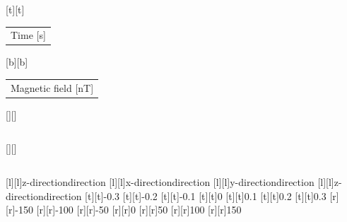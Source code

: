 %    
%
%
\begin{psfrags}%
\psfragscanon%
%
[t][t]{\color[rgb]{0,0,0}\setlength{\tabcolsep}{0pt}\begin{tabular}{c}Time [s]\end{tabular}}%
[b][b]{\color[rgb]{0,0,0}\setlength{\tabcolsep}{0pt}\begin{tabular}{c}Magnetic field [nT]\end{tabular}}%
[][]{\color[rgb]{0,0,0}\setlength{\tabcolsep}{0pt}\begin{tabular}{c} \end{tabular}}%
[][]{\color[rgb]{0,0,0}\setlength{\tabcolsep}{0pt}\begin{tabular}{c} \end{tabular}}%
[l][l]{\color[rgb]{0,0,0}z-directiondirection}%
[l][l]{\color[rgb]{0,0,0}x-directiondirection}%
[l][l]{\color[rgb]{0,0,0}y-directiondirection}%
[l][l]{\color[rgb]{0,0,0}z-directiondirection}%
%
[t][t]{-0.3}%
[t][t]{-0.2}%
[t][t]{-0.1}%
[t][t]{0}%
[t][t]{0.1}%
[t][t]{0.2}%
[t][t]{0.3}%
%
[r][r]{-150}%
[r][r]{-100}%
[r][r]{-50}%
[r][r]{0}%
[r][r]{50}%
[r][r]{100}%
[r][r]{150}%
%
%
\end{psfrags}%
%
